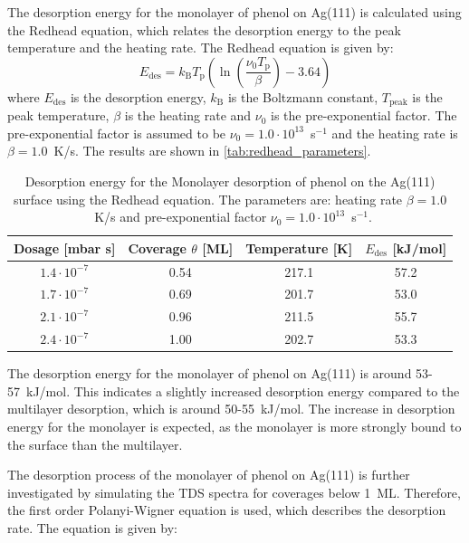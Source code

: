 \documentclass[fontsize=11pt,reqno,a4paper,oneside]{scrartcl}
\begin{document}
The desorption energy for the monolayer of phenol on Ag(111) is calculated using the Redhead equation\autocite{Redhead1962}, which relates the desorption energy to the peak temperature and the heating rate. The Redhead equation is given by:
\begin{equation}
E_\mathrm{des} = k_\mathrm{B}T_\mathrm{p}\left( \ln\left(\frac{\nu_0T_\mathrm{p}}{\beta}\right) -3.64 \right)
\end{equation}
where $E_\mathrm{des}$ is the desorption energy, $k_\mathrm{B}$ is the Boltzmann constant, $T_\mathrm{peak}$ is the peak temperature, $\beta$ is the heating rate and $\nu_0$ is the pre-exponential factor. The pre-exponential factor is assumed to be $\nu_0 = 1.0 \cdot 10^{13}$~s$^{-1}$ and the heating rate is $\beta = 1.0$~K/s. The results are shown in \autoref{tab:redhead_parameters}.

\begin{table}[htbp]
    \centering
    \caption{Desorption energy for the Monolayer desorption of phenol on the Ag(111) surface using the Redhead equation.\autocite{Redhead1962} The parameters are: heating rate $\beta = 1.0$~K/s and pre-exponential factor $\nu_0 = 1.0 \cdot 10^{13}$~s$^{-1}$.}
    \begin{tabular}{@{}cccc@{}}
        \toprule
        Dosage [mbar s] & Coverage $\theta$ [ML] & Temperature [K] & $E_\mathrm{des}$ [kJ/mol] \\
        \midrule
        $1.4\cdot 10^{-7}$ & 0.54 & 217.1 & 57.2 \\
        $1.7\cdot 10^{-7}$ & 0.69 & 201.7 & 53.0 \\
        $2.1\cdot 10^{-7}$ & 0.96 & 211.5 & 55.7 \\
        $2.4\cdot 10^{-7}$ & 1.00 & 202.7 & 53.3 \\
        \bottomrule
    \end{tabular}
    \label{tab:redhead_parameters}
\end{table}

The desorption energy for the monolayer of phenol on Ag(111) is around 53-57~kJ/mol. This indicates a slightly increased desorption energy compared to the multilayer desorption, which is around 50-55~kJ/mol. The increase in desorption energy for the monolayer is expected, as the monolayer is more strongly bound to the surface than the multilayer.

The desorption process of the monolayer of phenol on Ag(111) is further investigated by simulating the \ac{TDS} spectra for coverages below 1~ML. Therefore, the first order Polanyi-Wigner equation is used, which describes the desorption rate. The equation is given by:
\end{document}
